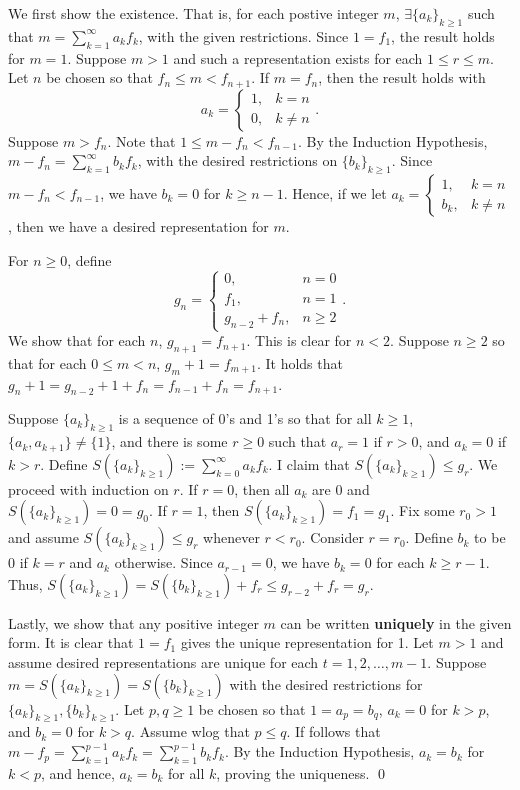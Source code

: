 \documentclass[12pt]{article}
\newcommand{\akseq}{\{a_k\}_{k\ge1}}
\newcommand{\bkseq}{\{b_k\}_{k\ge1}}
\newcommand{\ih}{Induction Hypothesis}
\begin{document}
We first show the existence. That is, for each postive integer $m$, $\exists \akseq$ such that $m=\sum_{k=1}^\infty a_kf_k$, with the given restrictions. Since $1=f_1$, the result holds for $m=1$. Suppose $m>1$ and such a representation exists for each $1\le r \le m$. Let $n$ be chosen so that $f_n\le m <f_{n+1}$. If $m=f_n$, then the result holds with 
$$
a_k= 
\begin{cases}
1,&k=n\\
0,&k\neq n
\end{cases}.
$$
Suppose $m>f_n$. Note that $1\le m-f_n< f_{n-1}$. By the \ih, $m-f_n=\sum_{k=1}^\infty b_kf_k$, with the desired restrictions on $\bkseq$. Since $m-f_n< f_{n-1}$, we have $b_k=0$ for $k\ge n-1$. Hence, if we let $a_k=
\begin{cases}1,&k=n\\b_k,&k\neq n\end{cases}$, then we have a desired representation for $m$.\\
\par
For $n\ge0$, define $$g_n=
\begin{cases}
0,&n=0\\
f_1,&n=1\\
g_{n-2}+f_n,&n\ge2
\end{cases}.
$$
We show that for each $n$, $g_{n+1}=f_{n+1}$. This is clear for $n<2$. Suppose $n\ge2$ so that for each $0\le m<n$, $g_m+1=f_{m+1}$. It holds that $g_n+1=g_{n-2}+1+f_n=f_{n-1}+f_n=f_{n+1}$.

Suppose $\akseq$ is a sequence of 0's and 1's so that for all $k\ge1$, $\{a_k,a_{k+1}\}\neq\{1\}$, and there is some $r\ge0$ such that $a_r=1$ if $r>0$, and $a_k=0$ if $k>r$. Define $S(\akseq):=\sum_{k=0}^\infty a_kf_k$. I claim that $S(\akseq)\le g_r$. We proceed with induction on $r$. If $r=0$, then all $a_k$ are 0 and $S(\akseq)=0=g_0$. If $r=1$, then $S(\akseq)=f_1=g_1$. Fix some $r_0>1$ and assume $S(\akseq)\le g_r$ whenever $r<r_0$. Consider $r=r_0$. Define $b_k$ to be 0 if $k=r$ and $a_k$ otherwise. Since $a_{r-1}=0$, we have $b_k=0$ for each $k\ge r-1$. Thus, $S(\akseq)=S(\bkseq)+f_r\le g_{r-2}+f_r = g_r$.\\

\par
Lastly, we show that any positive integer $m$ can be written \textbf{uniquely} in the given form. It is clear that $1=f_1$ gives the unique representation for 1. Let $m>1$ and assume desired representations are unique for each $t=1,2,\hdots,m-1$. Suppose $m=S(\akseq)=S(\bkseq)$ with the desired restrictions for $\akseq,\bkseq$. Let $p,q\ge1$ be chosen so that $1=a_p=b_q$, $a_k=0$ for $k>p$, and $b_k=0$ for $k>q$. Assume wlog that $p\le q$. If follows that $m-f_p=\sum_{k=1}^{p-1}a_kf_k=\sum_{k=1}^{p-1}b_kf_k$. By the \ih, $a_k=b_k$ for $k<p$, and hence, $a_k=b_k$ for all $k$, proving the uniqueness. \qed
\end{document}
